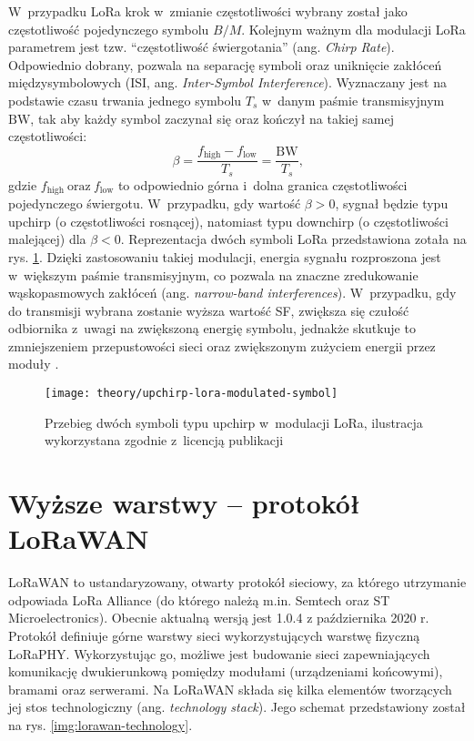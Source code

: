 W~przypadku LoRa krok w~zmianie częstotliwości wybrany został jako częstotliwość pojedynczego symbolu $B/M$. Kolejnym
ważnym dla modulacji LoRa parametrem jest tzw. \enquote{częstotliwość świergotania} (ang. \textsl{Chirp Rate}).
Odpowiednio dobrany, pozwala na separację symboli oraz uniknięcie zakłóceń międzysymbolowych (ISI, ang.
\textsl{Inter-Symbol Interference}). Wyznaczany jest na podstawie czasu trwania jednego symbolu $T_s$ w~danym paśmie
transmisyjnym $\mathrm{BW}$, tak aby każdy symbol zaczynał się oraz kończył na takiej samej częstotliwości:
\begin{equation}
    \beta = \frac{f_{\mathrm{high}}-f_{\mathrm{low}}}{T_s}=\frac{\mathrm{BW}}{T_s}\text{,}
\end{equation}
gdzie $f_{\mathrm{high}}\ \text{oraz}\ f_{\mathrm{low}}$ to odpowiednio górna i~dolna granica częstotliwości
pojedynczego świergotu. W~przypadku, gdy wartość $\beta > 0$, sygnał będzie typu upchirp (o częstotliwości rosnącej),
natomiast typu downchirp (o częstotliwości malejącej) dla $\beta < 0$. Reprezentacja dwóch symboli LoRa
\cite{lora-emulator} przedstawiona zotała na rys. \ref{img:upchirp-lora-modulated-symbol}. Dzięki zastosowaniu takiej
modulacji, energia sygnału rozproszona jest w~większym paśmie transmisyjnym, co pozwala na znaczne zredukowanie
wąskopasmowych zakłóceń (ang. \textsl{narrow-band interferences}). W~przypadku, gdy do transmisji wybrana zostanie
wyższa wartość SF, zwiększa się czułość odbiornika z~uwagi na zwiększoną energię symbolu, jednakże skutkuje to
zmniejszeniem przepustowości sieci oraz zwiększonym zużyciem energii przez moduły \cite{css-modulation-technique}.

\begin{figure}[!htbp]
    \centering
    \texttt{[image: theory/upchirp-lora-modulated-symbol]}
    \caption{\label{img:upchirp-lora-modulated-symbol}Przebieg dwóch symboli typu upchirp w~modulacji LoRa, ilustracja
        wykorzystana zgodnie z~licencją publikacji \cite{lora-emulator}}
\end{figure}

\FloatBarrier

\section{\label{sect:lorawan}Wyższe warstwy -- protokół LoRaWAN} LoRaWAN to ustandaryzowany, otwarty protokół sieciowy,
za którego utrzymanie odpowiada LoRa Alliance (do którego należą m.in. Semtech oraz ST Microelectronics). Obecnie
aktualną wersją jest 1.0.4 z października 2020 r. Protokół definiuje górne warstwy sieci wykorzystujących warstwę fizyczną
LoRaPHY. Wykorzystując go, możliwe jest budowanie sieci zapewniających komunikację dwukierunkową pomiędzy modułami
(urządzeniami końcowymi), bramami oraz serwerami. Na LoRaWAN składa się kilka elementów tworzących jej stos
technologiczny (ang. \textsl{technology stack}). Jego schemat przedstawiony został na rys. \ref{img:lorawan-technology}.

